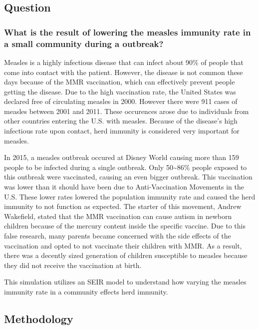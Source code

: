 \documentclass[11pt]{article}
\begin{document}
    \hypertarget{question}{%
\subsection{Question}\label{question}}

\hypertarget{what-is-the-result-of-lowering-the-measles-immunity-rate-in-a-small-community-during-a-outbreak}{%
\subsubsection{What is the result of lowering the measles immunity rate
in a small community during a
outbreak?}\label{what-is-the-result-of-lowering-the-measles-immunity-rate-in-a-small-community-during-a-outbreak}}

Measles is a highly infectious disease that can infect about 90\% of
people that come into contact with the patient. However, the disease is
not common these days because of the MMR vaccination, which can
effectively prevent people getting the disease. Due to the high
vaccination rate, the United States was declared free of circulating
measles in 2000. However there were 911 cases of measles between 2001
and 2011. These occurences arose due to individuals from other countries
entering the U.S. with measles. Because of the disease's high infectious
rate upon contact, herd immunity is considered very important for
measles.

In 2015, a measles outbreak occured at Disney World causing more than
159 people to be infected during a single outbreak. Only
50\textasciitilde{}86\% people exposed to this outbreak were vaccinated,
causing an even bigger outbreak. This vaccination was lower than it
should have been due to Anti-Vaccination Movements in the U.S. These
lower rates lowered the population immunity rate and caused the herd
immunity to not function as expected. The starter of this movement,
Andrew Wakefield, stated that the MMR vaccination can cause autism in
newborn children because of the mercury content inside the specific
vaccine. Due to this false research, many parents became concerned with
the side effects of the vaccination and opted to not vaccinate their
children with MMR. As a result, there was a decently sized generation of
children susceptible to measles because they did not receive the
vaccination at birth.

This simulation utilizes an SEIR model to understand how varying the
measles immunity rate in a community effects herd immunity.

\hypertarget{methodology}{%
\subsection{Methodology}\label{methodology}}
\end{document}
